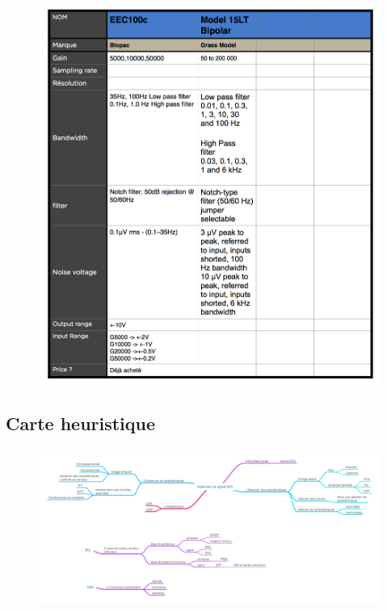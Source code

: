 \begin{figure}[h]
	\centering\includegraphics[width=17cm, angle=0]{images/ComparaisonAmpli.jpg}
\end{figure}



\newpage
\subsection* {Carte heuristique}

\begin{figure}[h]
	\centering\includegraphics[width=19cm,angle=90,]{images/CarteHeuristiqueSignalProcessing.png}
\end{figure}
\newpage
